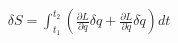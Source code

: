 \documentclass[preview]{standalone}
\begin{document}
\begin{align*}
δS = \int_{t_1}^{t_2} \left( \frac{\partial L}{\partial q} \delta q + \frac{\partial L}{\partial \dot{q}} \delta \dot{q} \right) dt
\end{align*}
\end{document}
